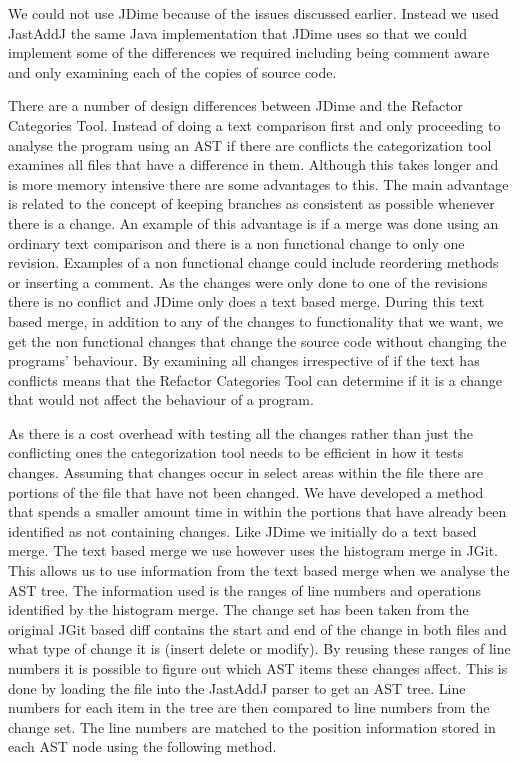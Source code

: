 We could not use JDime because of the issues discussed earlier. Instead we used JastAddJ the same Java implementation that JDime uses so that we could implement some of the differences we required including being comment aware and only examining each of the copies of source code.

There are a number of design differences between JDime and the Refactor Categories Tool.  Instead of doing a text comparison first and only proceeding to analyse the program using an AST if there are conflicts the categorization tool examines all files that have a difference in them.  Although this takes longer and is more memory intensive there are some advantages to this. The main advantage is related to the concept of keeping branches as consistent as possible whenever there is a change. An example of this advantage is if a merge was done using an ordinary text comparison and there is a non functional change to only one revision. Examples of a non functional change could include reordering methods or inserting a comment.  As the changes were only done to one of the revisions there is no conflict and JDime only does a text based merge.  During this text based merge, in addition to any of the changes to functionality that we want, we get the non functional changes that change the source code without changing the programs' behaviour. By examining all changes irrespective of if the text has conflicts means that the Refactor Categories Tool can determine if it is a change that would not affect the behaviour of a program.

As there is a cost overhead with testing all the changes rather than just the conflicting ones the categorization tool needs to be efficient in how it tests changes.  Assuming that changes occur in select areas within the file there are portions of the file that have not been changed.  We have developed a method that spends a smaller amount time in  within the portions that have already been identified as not containing changes.  Like JDime we initially do a text based merge.  The text based merge we use however uses the histogram merge in JGit.  This allows us to use information from the text based merge when we analyse the AST tree.  The information used is the ranges of line numbers and operations identified by the histogram merge. The change set has been taken from the original JGit based diff contains the start and end of the change in both files and what type of change it is (insert delete or modify).  By reusing these ranges of line numbers it is possible to figure out which AST items these changes affect. This is done by loading the file into the JastAddJ parser to get an AST tree. Line numbers for each item in the tree are then compared to line numbers from the change set. The line numbers are matched to the position information stored in each AST node using the following method.

